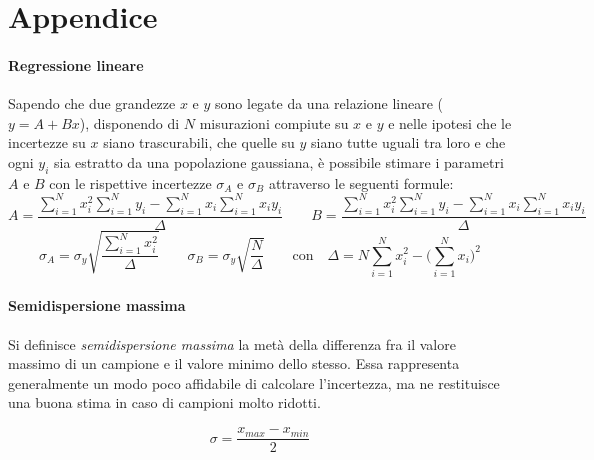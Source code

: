 \documentclass{article}
\begin{document}
\section*{Appendice}
\paragraph{Regressione lineare} Sapendo che due grandezze $x$ e $y$ sono legate da una relazione lineare ($ y = A + B x $), disponendo di $N$ misurazioni compiute su $x$ e $y$ e nelle ipotesi che le incertezze su $x$ siano trascurabili, che quelle su $y$ siano tutte uguali tra loro e che ogni $y_i$ sia estratto da una popolazione gaussiana,  è possibile stimare i parametri $A$ e $B$ con le rispettive incertezze $\sigma_A$ e $\sigma_B$ attraverso le seguenti formule:
$$ A = \dfrac{\displaystyle\sum_{i=1}^{N} x_i ^ 2 \displaystyle\sum_{i=1}^{N} y_i - \displaystyle\sum_{i=1}^{N} x_i \displaystyle\sum_{i=1}^{N} x_i y_i}{\Delta} \qquad
B = \dfrac{\displaystyle\sum_{i=1}^{N} x_i ^ 2 \displaystyle\sum_{i=1}^{N} y_i - \displaystyle\sum_{i=1}^{N} x_i \displaystyle\sum_{i=1}^{N} x_i y_i}{\Delta} $$
$$\sigma_A = \sigma_y \sqrt{\dfrac{\displaystyle\sum_{i=1}^{N} x_i ^ 2}{\Delta}} \qquad
\sigma_B = \sigma_y \sqrt{\dfrac{N}{\Delta}} \qquad
\text{con} \quad \Delta = N \displaystyle\sum_{i=1}^{N}x_i ^ 2 - \Bigg( \displaystyle\sum_{i=1}^{N}x_i \Bigg) ^ 2 $$

\paragraph{Semidispersione massima} Si definisce \textit{semidispersione massima} la metà della differenza fra il valore massimo di un campione e il valore minimo dello stesso. Essa rappresenta generalmente un modo poco affidabile di calcolare l'incertezza, ma ne restituisce una buona stima in caso di campioni molto ridotti.

$$ \sigma = \frac{x_{max}-x_{min}}{2} $$
\end{document}
